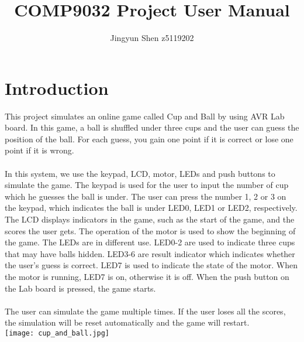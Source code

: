 \documentclass[a4paper, 12 pt]{report}
\begin{document}
\title{COMP9032 Project User Manual}
\author{Jingyun Shen z5119202}
\date{}
\maketitle
\pagestyle{empty}
\setcounter{section}{0}
\newpage

\section{Introduction}

This project simulates an online game called Cup and Ball by using AVR Lab board. In this game, a ball is shuffled under three cups and the user can guess the position of the ball. For each guess, you gain one point if it is correct or lose one point if it is wrong.\\
\\
In this system, we use the keypad, LCD, motor, LEDs and push buttons to simulate the game. The keypad is used for the user to input the number of cup which he guesses the ball is under. The user can press the number 1, 2 or 3 on the keypad, which indicates the ball is under LED0, LED1 or LED2, respectively. The LCD displays indicators in the game, such as the start of the game, and the scores the user gets. The operation of the motor is used to show the beginning of the game. The LEDs are in different use. LED0-2 are used to indicate three cups that may have balls hidden. LED3-6 are result indicator which indicates whether the user's guess is correct. LED7 is used to indicate the state of the motor. When the motor is running, LED7 is on, otherwise it is off. When the push button on the Lab board is pressed, the game starts.\\
\\
The user can simulate the game multiple times. If the user loses all the scores, the simulation will be reset automatically and the game will restart.
\\


\texttt{[image: cup\_and\_ball.jpg]}

\newpage
\end{document}

